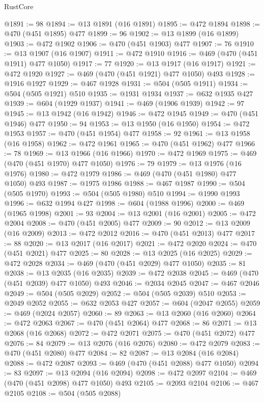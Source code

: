 \begin{lexlean}{RustCore}
\begin{coremodule}
@1891 := 98
@1894 := @13 @1891 (@16 @1891)
@1895 := @472 @1894
@1898 := @470 (@451 @1895) @477
@1899 := 96
@1902 := @13 @1899 (@16 @1899)
@1903 := @472 @1902
@1906 := @470 (@451 @1903) @477
@1907 := 76
@1910 := @13 @1907 (@16 @1907)
@1911 := @472 @1910
@1916 := @469 (@470 (@451 @1911) @477 @1050)
@1917 := 77
@1920 := @13 @1917 (@16 @1917)
@1921 := @472 @1920
@1927 := @469 (@470 (@451 @1921) @477 @1050) @493
@1928 := @1916 @1927
@1929 := @467 @1928
@1931 := @504 (@505 @1911)
@1934 := @504 (@505 @1921) @510
@1935 := @1931 @1934
@1937 := @632 @1935 @427
@1939 := @604 (@1929 @1937)
@1941 := @469 (@1906 @1939)
@1942 := 97
@1945 := @13 @1942 (@16 @1942)
@1946 := @472 @1945
@1949 := @470 (@451 @1946) @477
@1950 := 94
@1953 := @13 @1950 (@16 @1950)
@1954 := @472 @1953
@1957 := @470 (@451 @1954) @477
@1958 := 92
@1961 := @13 @1958 (@16 @1958)
@1962 := @472 @1961
@1965 := @470 (@451 @1962) @477
@1966 := 78
@1969 := @13 @1966 (@16 @1966)
@1970 := @472 @1969
@1975 := @469 (@470 (@451 @1970) @477 @1050)
@1976 := 79
@1979 := @13 @1976 (@16 @1976)
@1980 := @472 @1979
@1986 := @469 (@470 (@451 @1980) @477 @1050) @493
@1987 := @1975 @1986
@1988 := @467 @1987
@1990 := @504 (@505 @1970)
@1993 := @504 (@505 @1980) @510
@1994 := @1990 @1993
@1996 := @632 @1994 @427
@1998 := @604 (@1988 @1996)
@2000 := @469 (@1965 @1998)
@2001 := 93
@2004 := @13 @2001 (@16 @2001)
@2005 := @472 @2004
@2008 := @470 (@451 @2005) @477
@2009 := 90
@2012 := @13 @2009 (@16 @2009)
@2013 := @472 @2012
@2016 := @470 (@451 @2013) @477
@2017 := 88
@2020 := @13 @2017 (@16 @2017)
@2021 := @472 @2020
@2024 := @470 (@451 @2021) @477
@2025 := 80
@2028 := @13 @2025 (@16 @2025)
@2029 := @472 @2028
@2034 := @469 (@470 (@451 @2029) @477 @1050)
@2035 := 81
@2038 := @13 @2035 (@16 @2035)
@2039 := @472 @2038
@2045 := @469 (@470 (@451 @2039) @477 @1050) @493
@2046 := @2034 @2045
@2047 := @467 @2046
@2049 := @504 (@505 @2029)
@2052 := @504 (@505 @2039) @510
@2053 := @2049 @2052
@2055 := @632 @2053 @427
@2057 := @604 (@2047 @2055)
@2059 := @469 (@2024 @2057)
@2060 := 89
@2063 := @13 @2060 (@16 @2060)
@2064 := @472 @2063
@2067 := @470 (@451 @2064) @477
@2068 := 86
@2071 := @13 @2068 (@16 @2068)
@2072 := @472 @2071
@2075 := @470 (@451 @2072) @477
@2076 := 84
@2079 := @13 @2076 (@16 @2076)
@2080 := @472 @2079
@2083 := @470 (@451 @2080) @477
@2084 := 82
@2087 := @13 @2084 (@16 @2084)
@2088 := @472 @2087
@2093 := @469 (@470 (@451 @2088) @477 @1050)
@2094 := 83
@2097 := @13 @2094 (@16 @2094)
@2098 := @472 @2097
@2104 := @469 (@470 (@451 @2098) @477 @1050) @493
@2105 := @2093 @2104
@2106 := @467 @2105
@2108 := @504 (@505 @2088)

\end{coremodule}
\end{lexlean}
